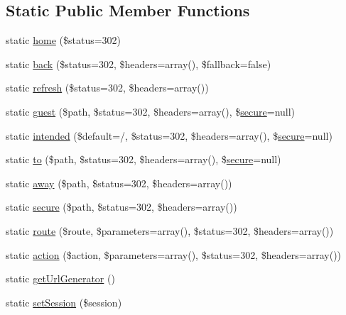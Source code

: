 \subsection*{Static Public Member Functions}
\begin{DoxyCompactItemize}
\item 
static \mbox{\hyperlink{class_illuminate_1_1_support_1_1_facades_1_1_redirect_adacf87957793d6ea7098942131255232}{home}} (\$status=302)
\item 
static \mbox{\hyperlink{class_illuminate_1_1_support_1_1_facades_1_1_redirect_a449942743abdca58f7d23ddd04110c18}{back}} (\$status=302, \$headers=array(), \$fallback=false)
\item 
static \mbox{\hyperlink{class_illuminate_1_1_support_1_1_facades_1_1_redirect_acfa54d4aec2ac31e33d601562f4eeb74}{refresh}} (\$status=302, \$headers=array())
\item 
static \mbox{\hyperlink{class_illuminate_1_1_support_1_1_facades_1_1_redirect_a91f592eb2889c431fc37134f4c36ec70}{guest}} (\$path, \$status=302, \$headers=array(), \$\mbox{\hyperlink{class_illuminate_1_1_support_1_1_facades_1_1_redirect_a6bebb89e6744dbe5100f40d584a027e4}{secure}}=null)
\item 
static \mbox{\hyperlink{class_illuminate_1_1_support_1_1_facades_1_1_redirect_ad0b6425f7fb664e0fc16216ac382a0d6}{intended}} (\$default=\textquotesingle{}/\textquotesingle{}, \$status=302, \$headers=array(), \$\mbox{\hyperlink{class_illuminate_1_1_support_1_1_facades_1_1_redirect_a6bebb89e6744dbe5100f40d584a027e4}{secure}}=null)
\item 
static \mbox{\hyperlink{class_illuminate_1_1_support_1_1_facades_1_1_redirect_aa2b771688d2c0ff2cbed8ce23b124dd3}{to}} (\$path, \$status=302, \$headers=array(), \$\mbox{\hyperlink{class_illuminate_1_1_support_1_1_facades_1_1_redirect_a6bebb89e6744dbe5100f40d584a027e4}{secure}}=null)
\item 
static \mbox{\hyperlink{class_illuminate_1_1_support_1_1_facades_1_1_redirect_a12a20d44a06b83aceefce29da7f40956}{away}} (\$path, \$status=302, \$headers=array())
\item 
static \mbox{\hyperlink{class_illuminate_1_1_support_1_1_facades_1_1_redirect_a6bebb89e6744dbe5100f40d584a027e4}{secure}} (\$path, \$status=302, \$headers=array())
\item 
static \mbox{\hyperlink{class_illuminate_1_1_support_1_1_facades_1_1_redirect_a8976d4399bdbe86aab3716e079acab0e}{route}} (\$route, \$parameters=array(), \$status=302, \$headers=array())
\item 
static \mbox{\hyperlink{class_illuminate_1_1_support_1_1_facades_1_1_redirect_a3afdcc4304c61b05589dd80783b490f7}{action}} (\$action, \$parameters=array(), \$status=302, \$headers=array())
\item 
static \mbox{\hyperlink{class_illuminate_1_1_support_1_1_facades_1_1_redirect_aadafc811c57a4418446704c6d6774bd3}{get\+Url\+Generator}} ()
\item 
static \mbox{\hyperlink{class_illuminate_1_1_support_1_1_facades_1_1_redirect_aff43d10268ae2b79c90381153dac11d1}{set\+Session}} (\$session)
\end{DoxyCompactItemize}


